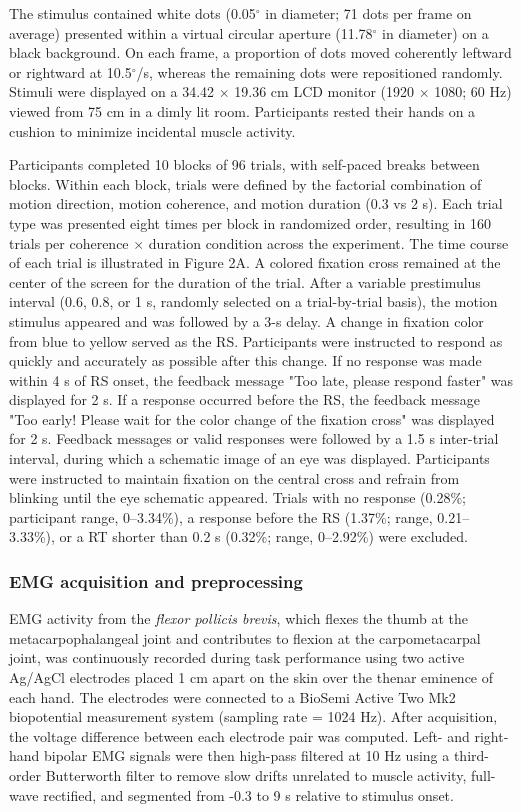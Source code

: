 The stimulus contained white dots (0.05$^{\circ}$ in diameter;  71 dots per frame on average) presented within a virtual circular aperture  (11.78$^{\circ}$ in diameter)  on a black background. On each frame, a proportion of dots moved coherently leftward or rightward at 10.5$^{\circ}$/s, whereas the remaining dots were repositioned randomly. Stimuli were displayed on a 34.42 $\times$ 19.36 cm LCD monitor (1920 $\times$ 1080; 60 Hz) viewed from 75 cm in a dimly lit room. Participants rested their hands on a cushion to minimize incidental muscle activity.

Participants completed 10 blocks of 96 trials, with self-paced breaks between blocks. Within each block, trials were defined by the factorial combination of motion direction, motion coherence, and motion duration (0.3 vs 2  s). Each trial type was presented eight times per block in randomized order, resulting in 160 trials per coherence $\times$ duration condition across the experiment.  The time course of each trial is illustrated in Figure 2A. A colored fixation cross remained at the center of the screen for the duration of the trial. After a variable prestimulus interval (0.6, 0.8, or 1  s, randomly selected on a trial-by-trial basis), the motion  stimulus appeared and was followed by a  3-s delay. A change in fixation color from blue to yellow served as the RS. Participants were instructed to respond as quickly and accurately as possible after this change. If no response was made within 4 s of RS onset, the feedback message "Too late, please respond faster" was displayed for 2  s. If a response occurred before the RS, the feedback message "Too early! Please wait for the color change of the fixation cross" was displayed for 2  s. Feedback messages or valid responses were followed by a 1.5  s inter-trial interval, during which a schematic image of an eye was displayed. Participants were instructed to maintain fixation on the central cross and refrain from blinking  until the eye schematic appeared.  Trials with no response  (0.28\%;  participant range, 0--3.34\%), a response before the RS (1.37\%; range, 0.21--3.33\%), or a RT shorter than  0.2 s (0.32\%; range, 0--2.92\%) were excluded.


\subsubsection{EMG acquisition and preprocessing}

EMG activity from  the \emph{flexor pollicis brevis}, which flexes the thumb at the metacarpophalangeal joint and contributes to flexion at the carpometacarpal joint, was continuously recorded during task performance using two active Ag/AgCl electrodes placed 1 cm apart on the skin over the thenar eminence of each hand.  The electrodes were connected to a BioSemi Active  Two Mk2 biopotential measurement system (sampling rate = 1024 Hz).  After acquisition, the voltage difference between each electrode pair was computed. Left- and right-hand  bipolar EMG signals were then high-pass filtered at  10 Hz using a third-order Butterworth filter to remove slow drifts unrelated to muscle activity, full-wave rectified, and segmented from -0.3 to 9 s relative to stimulus onset.

